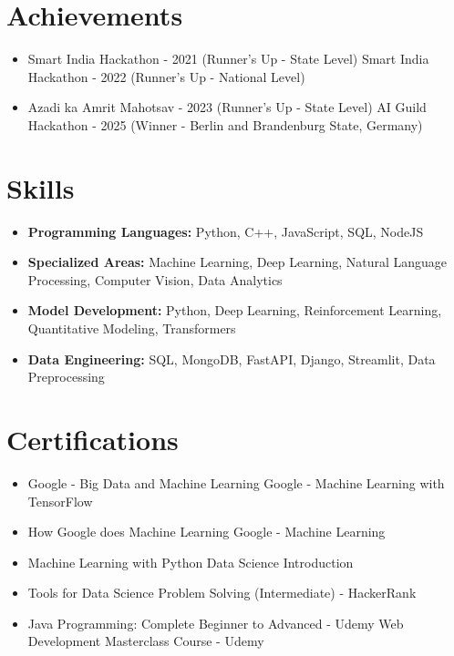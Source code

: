 \documentclass[a4paper,10pt]{article}
\begin{document}
\section*{Achievements}
\begin{itemize}
\item Smart India Hackathon - 2021 (Runner's Up - State Level) \hfill Smart India Hackathon - 2022 (Runner's Up - National Level)
\item Azadi ka Amrit Mahotsav - 2023 (Runner's Up - State Level) \hfill AI Guild Hackathon - 2025 (Winner - Berlin and Brandenburg State, Germany)
\end{itemize}

\section*{Skills}
\begin{itemize}
  \item \textbf{Programming Languages:} Python, C++, JavaScript, SQL, NodeJS
  \item \textbf{Specialized Areas:} Machine Learning, Deep Learning, Natural Language Processing, Computer Vision, Data Analytics
  \item \textbf{Model Development:} Python, Deep Learning, Reinforcement Learning, Quantitative Modeling, Transformers
  \item \textbf{Data Engineering:} SQL, MongoDB, FastAPI, Django, Streamlit, Data Preprocessing
\end{itemize}

\section*{Certifications}
\begin{itemize}
\item Google - Big Data and Machine Learning \hfill Google - Machine Learning with TensorFlow
\item How Google does Machine Learning \hfill Google - Machine Learning
\item Machine Learning with Python \hfill Data Science Introduction
\item Tools for Data Science \hfill Problem Solving (Intermediate) - HackerRank
\item Java Programming: Complete Beginner to Advanced - Udemy \hfill Web Development Masterclass Course - Udemy
\end{itemize}
\end{document}
